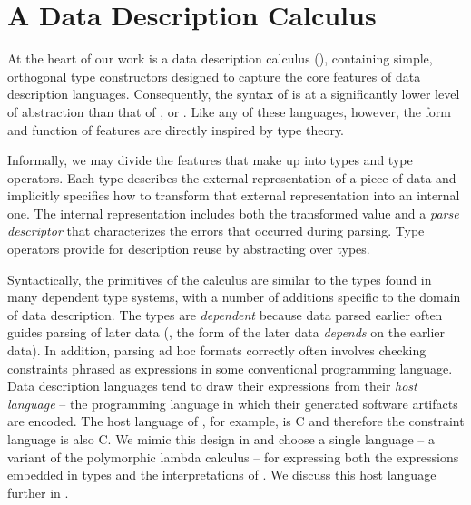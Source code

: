 \section{A Data Description Calculus}
\label{sec:ddc}

At the heart of our work is a data description calculus (\ddc{}),
containing simple, orthogonal type constructors designed to capture
the core features of data description languages.  Consequently, the
syntax of \ddc{} is at a significantly lower level of abstraction than
that of \padsc{}, \padsml{} or \ipads.  Like any of these languages, 
however, the form and function of \ddc{} features are directly 
inspired by type theory.  

Informally, we may divide the features that make up \ddc{} into types and
type operators. Each \ddc{} type describes the external representation
of a piece of data and implicitly specifies how to transform that
external representation into an internal one.  The internal
representation includes both the transformed value and a \textit{parse
  descriptor} that characterizes the errors that occurred during
parsing. Type operators provide for description reuse by abstracting
over types.

Syntactically, the primitives of the calculus are similar to the types
found in many dependent type systems, with a number of additions
specific to the domain of data description.  The types are {\em dependent} 
because data parsed earlier often guides parsing of later data
(\ie{}, the form of the later data {\em depends} on the earlier data).
In addition, parsing ad hoc formats correctly
often involves checking constraints 
phrased as expressions in some conventional programming language.
%
%
Data description languages tend to draw their expressions
from their {\em host language} -- the programming language in which
their generated software artifacts are encoded.  The host language of
\padsc{}, for example, is C and therefore the \padsc{} constraint
language is also C.  We mimic this design in
\ddc{} and choose a single language -- a variant of the polymorphic 
lambda calculus \fomega\cite{girard:SystemF,reynolds:SystemF} -- for
expressing both the expressions embedded in types and the
interpretations of \ddc. We discuss this host language further in
.

